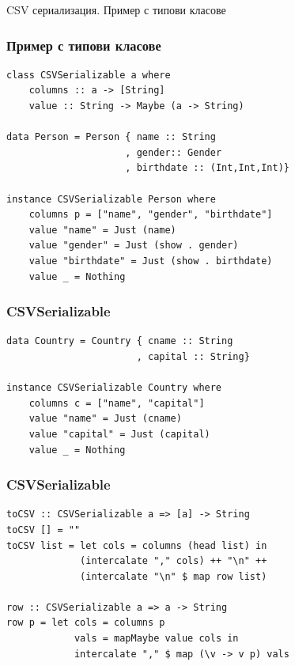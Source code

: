 \documentclass{beamer}
\begin{document}
\begin{frame}
  \centerline{CSV сериализация. Пример с типови класове}
\end{frame}

\begin{frame}[fragile]
\frametitle{Пример с типови класове}

\begin{lstlisting}[basicstyle=\small]
class CSVSerializable a where
    columns :: a -> [String]
    value :: String -> Maybe (a -> String)

data Person = Person { name :: String
                     , gender:: Gender
                     , birthdate :: (Int,Int,Int)}

instance CSVSerializable Person where
    columns p = ["name", "gender", "birthdate"]
    value "name" = Just (name)
    value "gender" = Just (show . gender)
    value "birthdate" = Just (show . birthdate)
    value _ = Nothing
  \end{lstlisting}


\end{frame}


\begin{frame}[fragile]
\frametitle{CSVSerializable}

\begin{lstlisting}[basicstyle=\small]
data Country = Country { cname :: String
                       , capital :: String}

instance CSVSerializable Country where
    columns c = ["name", "capital"]
    value "name" = Just (cname)
    value "capital" = Just (capital)
    value _ = Nothing
\end{lstlisting}


\end{frame}


\begin{frame}[fragile]
\frametitle{CSVSerializable}

\begin{lstlisting}[basicstyle=\small]
toCSV :: CSVSerializable a => [a] -> String
toCSV [] = ""
toCSV list = let cols = columns (head list) in
             (intercalate "," cols) ++ "\n" ++
             (intercalate "\n" $ map row list)

row :: CSVSerializable a => a -> String
row p = let cols = columns p 
            vals = mapMaybe value cols in
            intercalate "," $ map (\v -> v p) vals
\end{lstlisting}


\end{frame}



\end{document}
